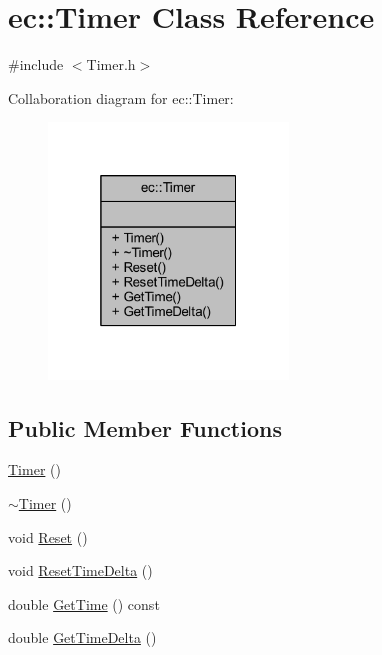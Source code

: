 \hypertarget{classec_1_1_timer}{}\section{ec\+:\+:Timer Class Reference}
\label{classec_1_1_timer}


{\ttfamily \#include $<$Timer.\+h$>$}



Collaboration diagram for ec\+:\+:Timer\+:\nopagebreak
\begin{figure}[H]
\begin{center}
\leavevmode
\includegraphics[width=181pt]{classec_1_1_timer__coll__graph}
\end{center}
\end{figure}
\subsection*{Public Member Functions}
\begin{DoxyCompactItemize}
\item 
\mbox{\hyperlink{classec_1_1_timer_afa10f411221610c507291183b6b6aa56}{Timer}} ()
\item 
\mbox{\hyperlink{classec_1_1_timer_a496dc6127f9d0c8ec3dc8d91de6b6448}{$\sim$\+Timer}} ()
\item 
void \mbox{\hyperlink{classec_1_1_timer_a241c38c45185bf51c5b5ac32f4b1f89a}{Reset}} ()
\item 
void \mbox{\hyperlink{classec_1_1_timer_aef045d450e959956d09a6d816c4ca406}{Reset\+Time\+Delta}} ()
\item 
double \mbox{\hyperlink{classec_1_1_timer_acadbad5c86afeaf115596dc7dedfd303}{Get\+Time}} () const
\item 
double \mbox{\hyperlink{classec_1_1_timer_adae128c90f92cf2dc71dc1095ba60b2f}{Get\+Time\+Delta}} ()
\end{DoxyCompactItemize}


